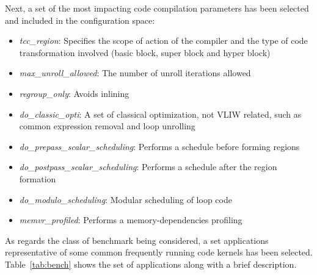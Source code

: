 Next, a set of the most impacting code compilation parameters has been
selected and included in the configuration space:
\begin{itemize}
\item \emph{tcc\_region}: Specifies the scope of action of the compiler and the type
of code transformation involved (basic block, super block and hyper
block) 
\item \emph {max\_unroll\_allowed}: The number of unroll iterations allowed
\item \emph{regroup\_only}: Avoids inlining 
\item \emph{do\_classic\_opti}: A set of classical optimization, not VLIW related,
such as common expression removal and loop unrolling
\item \emph{do\_prepass\_scalar\_scheduling}: Performs a schedule before
forming regions 
\item \emph{do\_postpass\_scalar\_scheduling}: Performs a schedule after the region formation 
\item \emph{do\_modulo\_scheduling}: Modular scheduling of loop code
\item \emph{memvr\_profiled}: Performs a memory-dependencies profiling 
\end{itemize}

As regards the class of benchmark being considered, a set applications representative of some common
frequently running code kernels has been selected. Table~\ref{tab:bench} shows the set of applications
along with a brief description.

